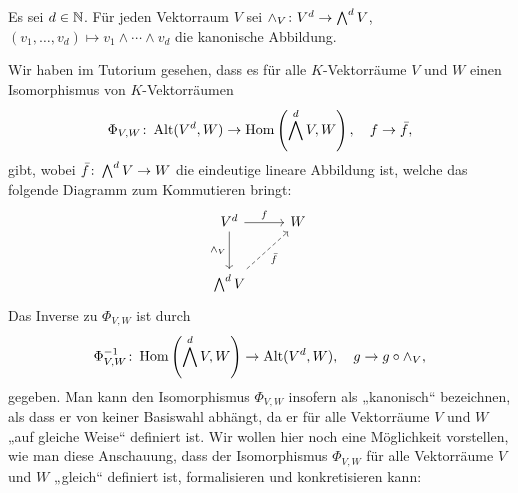 \section{}

Es sei $d \in \mathbb{N}$.
Für jeden Vektorraum $V$ sei $\wedge_V \colon V^d \to \bigwedge^{d} V$, $(v_1, \dotsc, v_d) \mapsto v_1 \wedge \dotsb \wedge v_d$ die kanonische Abbildung.

Wir haben im Tutorium gesehen, dass es für alle $K$-Vektorräume $V$ und $W$ einen Isomorphismus von $K$-Vektorräumen
\[
          \Phi_{V, W}
  \colon  \operatorname{Alt}( V^d, W )
  \to     \operatorname{Hom}\left( \bigwedge^{d} V, W \right),
  \quad   f
  \to     \bar{f},
\]
gibt, wobei $\bar{f} \colon \bigwedge^{d} V \to W$ die eindeutige lineare Abbildung ist, welche das folgende Diagramm zum Kommutieren bringt:
\[
  \begin{tikzcd}[row sep = large]
      V^d
      \arrow{r}{f}
      \arrow[swap]{d}{\wedge_V}
    & W
    \\
      \exteriorpower{d}{V}
      \arrow[densely dashed, swap]{ru}{\induced{f}}
    & {}
  \end{tikzcd}
\]
Das Inverse zu $\Phi_{V,W}$ ist durch
\[
          \Phi_{V, W}^{-1}
  \colon  \operatorname{Hom}\left( \bigwedge^{d} V, W \right)
  \to     \operatorname{Alt}( V^d, W ),
  \quad   g
  \to     g \circ \wedge_V,
\]
gegeben.
Man kann den Isomorphismus $\Phi_{V,W}$ insofern als „kanonisch“ bezeichnen, als dass er von keiner Basiswahl abhängt, da er für alle Vektorräume $V$ und $W$ „auf gleiche Weise“ definiert ist.
Wir wollen hier noch eine Möglichkeit vorstellen, wie man diese Anschauung, dass der Isomorphismus $\Phi_{V,W}$ für alle Vektorräume $V$ und $W$ „gleich“ definiert ist, formalisieren und konkretisieren kann:

